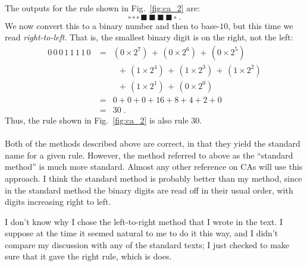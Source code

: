 \documentclass[12pt]{article}
\begin{document}
The outputs for the rule shown in Fig.~\ref{fig:ca_2} are:
\begin{equation}
  \square \, \square \, \square \, \blacksquare \, \blacksquare \,
  \blacksquare \, \blacksquare \, \square \;.
\end{equation}
We now convert this to a binary number and then to base-$10$, but this
time we read \emph{right-to-left}.  That is, the smallest binary
digit is on the right, not the left:
\begin{eqnarray}
 0 \, 0\, 0\, 1\, 1\, 1\, 1\, 0\; &=& (0 \times 2^7) \, + \, 
    (0 \times 2^6) \, + \, (0 \times 2^5) \nonumber \\
& & \;\;+ \, (1 \times 2^4) \, + \, (1 \times 2^3) \, + \, (1 \times
 2^2) \nonumber \\
& & \;\; + \, (1 \times 2^1) \, + \, (0 \times 2^0) \\
&= & 0+0+0+16+8+4+2+0 \\
&= & 30 \;.
\end{eqnarray}
Thus, the rule shown in Fig.~\ref{fig:ca_2} is also rule 30. \\


\\

Both of the methods described above are correct, in that they yield
the standard name for a given rule.  However, the method referred to
above as the ``standard method'' is much more standard.  Almost any
other reference on CAs will use this approach.  I think the standard
method is probably better than my method, since in the standard method
the binary digits are read off in their usual order, with digits
increasing right to left.

I don't know why I chose the left-to-right method that I wrote in the
text.  I suppose at the time it seemed natural to me to do it this
way, and I didn't compare my discussion with any of the standard
texts; I just checked to make sure that it gave the right rule, which
is does.  
\end{document}
